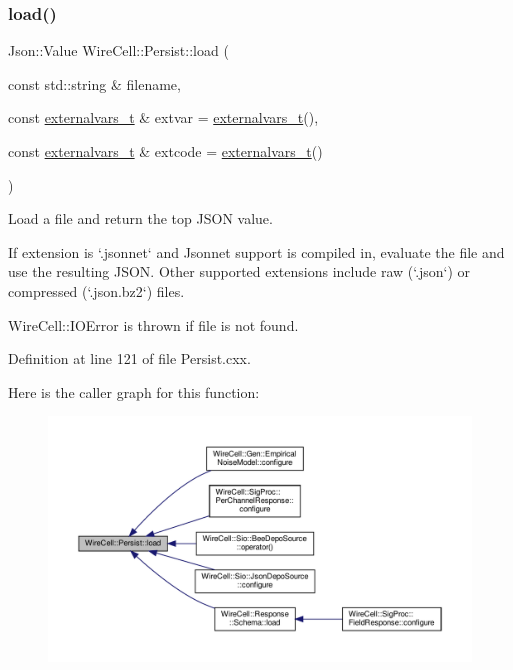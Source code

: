 \subsubsection{\texorpdfstring{load()}{load()}}
{\footnotesize\ttfamily Json\+::\+Value Wire\+Cell\+::\+Persist\+::load (\begin{DoxyParamCaption}\item[{const std\+::string \&}]{filename,  }\item[{const \hyperlink{namespace_wire_cell_1_1_persist_ae031fc57de5b5814ccd700d007bc847b}{externalvars\+\_\+t} \&}]{extvar = {\ttfamily \hyperlink{namespace_wire_cell_1_1_persist_ae031fc57de5b5814ccd700d007bc847b}{externalvars\+\_\+t}()},  }\item[{const \hyperlink{namespace_wire_cell_1_1_persist_ae031fc57de5b5814ccd700d007bc847b}{externalvars\+\_\+t} \&}]{extcode = {\ttfamily \hyperlink{namespace_wire_cell_1_1_persist_ae031fc57de5b5814ccd700d007bc847b}{externalvars\+\_\+t}()} }\end{DoxyParamCaption})}

Load a file and return the top J\+S\+ON value. \begin{DoxyVerb}If extension is `.jsonnet` and Jsonnet support is compiled
in, evaluate the file and use the resulting JSON.  Other
supported extensions include raw (`.json`) or compressed
(`.json.bz2`) files.  

WireCell::IOError is thrown if file is not found.\end{DoxyVerb}
 

Definition at line 121 of file Persist.\+cxx.

Here is the caller graph for this function\+:
\nopagebreak
\begin{figure}[H]
\begin{center}
\leavevmode
\includegraphics[width=350pt]{namespace_wire_cell_1_1_persist_ab922ff3e9c80bcbc9d4e8342f7d3223d_icgraph}
\end{center}
\end{figure}
\mbox{\label{namespace_wire_cell_1_1_persist_adce7b2acfe82eb122ed5d06f261e155e}} 
